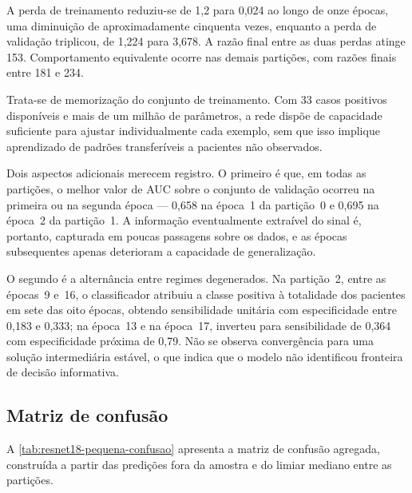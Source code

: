 A perda de treinamento reduziu-se de 1,2 para 0,024 ao longo de onze
épocas, uma diminuição de aproximadamente cinquenta vezes, enquanto a perda
de validação triplicou, de 1,224 para 3,678. A razão final entre as duas
perdas atinge 153. Comportamento equivalente ocorre nas demais partições, com
razões finais entre 181 e 234.

Trata-se de memorização do conjunto de treinamento. Com 33 casos positivos
disponíveis e mais de um milhão de parâmetros, a rede dispõe de capacidade
suficiente para ajustar individualmente cada exemplo, sem que isso implique
aprendizado de padrões transferíveis a pacientes não observados.

Dois aspectos adicionais merecem registro. O primeiro é que, em todas as
partições, o melhor valor de \gls{AUC} sobre o conjunto de validação ocorreu
na primeira ou na segunda época --- 0,658 na época~1 da partição~0 e 0,695 na
época~2 da partição~1. A informação eventualmente extraível do sinal é,
portanto, capturada em poucas passagens sobre os dados, e as épocas
subsequentes apenas deterioram a capacidade de generalização.

O segundo é a alternância entre regimes degenerados. Na partição~2, entre as
épocas~9 e~16, o classificador atribuiu a classe positiva à totalidade dos
pacientes em sete das oito épocas, obtendo sensibilidade unitária com
especificidade entre 0,183 e 0,333; na época~13 e na época~17, inverteu para
sensibilidade de 0,364 com especificidade próxima de 0,79. Não se observa
convergência para uma solução intermediária estável, o que indica que o
modelo não identificou fronteira de decisão informativa.

\subsection{Matriz de confusão}
\label{subsec:confusao-resnet18-pequena}

A \autoref{tab:resnet18-pequena-confusao} apresenta a matriz de confusão
agregada, construída a partir das predições fora da amostra e do limiar
mediano entre as partições.

\begin{table}[h!]
	\captionsetup{width=11cm}
\end{table}

